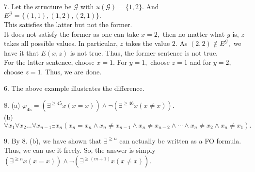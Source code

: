 \documentclass{article}
\begin{document}
\hrulefill

7. Let the structure be $\mathcal{G}$ with $u(\mathcal{G}) = \{1, 2\}.$ And $E^\mathcal{G} = \{(1, 1), (1, 2), (2, 1)\}.$\\
This satisfies the latter but not the former. \\
It does not satisfy the former as one can take $x = 2,$ then no matter what $y$ is, $z$ takes all possible values. In particular, $z$ takes the value $2.$ As $(2, 2) \notin E^\mathcal{G},$ we have it that $E(x, z)$ is not true. Thus, the former sentence is not true.\\
For the latter sentence, choose $x = 1.$ For $y = 1,$ choose $z = 1$ and for $y = 2,$ choose $z = 1.$ Thus, we are done.

\hrulefill

6. The above example illustrates the difference.

\hrulefill

8. (a) $\varphi_{45} = (\exists^{\ge45}x (x = x)) \wedge \neg(\exists^{\ge46}x(x \neq x)).$\\

(b) $\forall x_1 \forall x_2 \ldots \forall x_{n-1} \exists x_n (x_n = x_n \wedge x_n \neq x_{n-1} \wedge x_n \neq x_{n-2} \wedge \cdots \wedge x_n \neq x_2 \wedge x_n \neq x_1).$\\


\hrulefill

9. By 8. (b), we have shown that $\exists^{\ge n}$ can actually be written as a FO formula. Thus, we can use it freely. So, the answer is simply $(\exists^{\ge n}x (x = x)) \wedge \neg(\exists^{\ge (m+1)}x(x \neq x)).$
\end{document}
